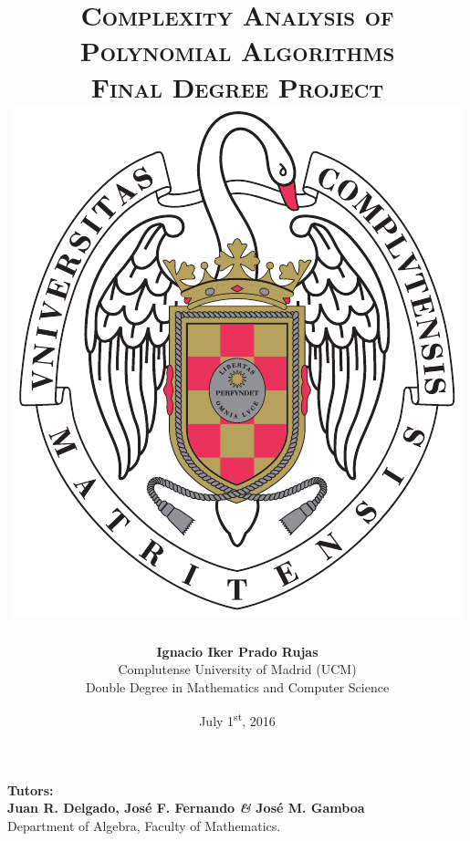 \documentclass[11pt, a4paper, english, twoside, notitlepage, openright]{report}
\begin{document}
\begin{titlepage}

\title{\Huge{\textsc{Complexity Analysis of\\
Polynomial Algorithms}} \\
\vspace{0.5cm}
\Large{\textsc{Final Degree Project}}\\
\vspace{2cm}
\protect\includegraphics[scale=0.6]{escudo_ucm.pdf}
\vspace{1.75cm}}
\author{\textbf{Ignacio Iker Prado Rujas} \\
Complutense University of Madrid (UCM) \\
Double Degree in Mathematics and Computer Science}
\date{July 1\textsuperscript{st}, 2016}
\maketitle
\thispagestyle{empty}

\vspace{1cm}
\begin{center}
\textbf{Tutors:} \\
\textbf{Juan R. Delgado, Jos\'e F. Fernando \textit{\&} Jos\'e M. Gamboa} \\
\vspace{0.1cm}
Department of Algebra, Faculty of Mathematics.
\end{center}

\end{titlepage}
\end{document}

